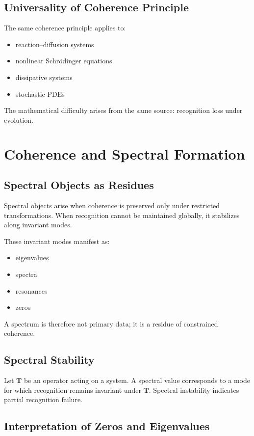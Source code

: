 \documentclass[12pt, oneside]{article}
\begin{document}
\subsection{Universality of Coherence Principle}

The same coherence principle applies to:
\begin{itemize}
    \item reaction--diffusion systems
    \item nonlinear Schrödinger equations
    \item dissipative systems
    \item stochastic PDEs
\end{itemize}
The mathematical difficulty arises from the same source: recognition loss under evolution.

\section{Coherence and Spectral Formation}

\subsection{Spectral Objects as Residues}

Spectral objects arise when coherence is preserved only under restricted transformations. When recognition cannot be maintained globally, it stabilizes along invariant modes.

These invariant modes manifest as:
\begin{itemize}
    \item eigenvalues
    \item spectra
    \item resonances
    \item zeros
\end{itemize}
A spectrum is therefore not primary data; it is a residue of constrained coherence.

\subsection{Spectral Stability}

Let $\mathbf{T}$ be an operator acting on a system. A spectral value corresponds to a mode for which recognition remains invariant under $\mathbf{T}$. Spectral instability indicates partial recognition failure.

\subsection{Interpretation of Zeros and Eigenvalues}
\end{document}
